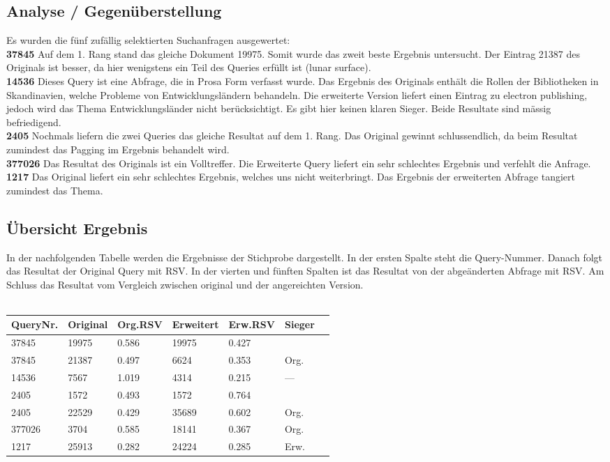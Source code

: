 \documentclass[a4paper, 10pt, ngerman, fleqn]{article}
\begin{document}
\subsection{Analyse / Gegenüberstellung}
Es wurden die fünf zufällig selektierten Suchanfragen ausgewertet:\\
\textbf{37845} Auf dem 1. Rang stand das gleiche Dokument 19975. Somit wurde das zweit beste Ergebnis untersucht. Der Eintrag 21387 des Originals ist besser, da hier wenigstens ein Teil des Queries erfüllt ist (lunar surface).\\
\textbf{14536} Dieses Query ist eine Abfrage, die in Prosa Form verfasst wurde. Das Ergebnis des Originals enthält die Rollen der Bibliotheken in Skandinavien, welche Probleme von Entwicklungsländern behandeln. Die erweiterte Version liefert einen Eintrag zu electron publishing, jedoch wird das Thema Entwicklungsländer nicht berücksichtigt. Es gibt hier keinen klaren Sieger. Beide Resultate sind mässig befriedigend.\\
\textbf{2405} Nochmals liefern die zwei Queries das gleiche Resultat auf dem 1. Rang. Das Original gewinnt schlussendlich, da beim Resultat zumindest das Pagging im Ergebnis behandelt wird.\\
\textbf{377026} Das Resultat des Originals ist ein Volltreffer. Die Erweiterte Query liefert ein sehr schlechtes Ergebnis und verfehlt die Anfrage.\\
\textbf{1217} Das Original liefert ein sehr schlechtes Ergebnis, welches uns nicht weiterbringt. Das Ergebnis der erweiterten Abfrage tangiert zumindest das Thema. 

\subsection{Übersicht Ergebnis}
In der nachfolgenden Tabelle werden die Ergebnisse der Stichprobe dargestellt. In der ersten Spalte steht die Query-Nummer. Danach folgt das Resultat der Original Query mit RSV. In der vierten und fünften Spalten ist das Resultat von der abgeänderten Abfrage mit RSV. Am Schluss das Resultat vom Vergleich zwischen original und der angereichten Version.\\
\\
\begin{tabular}{|l|l|l|l|l|l|l|}\hline\hline
	\textbf{QueryNr.} & \textbf{Original} & \textbf{Org.RSV} & \textbf{Erweitert} & \textbf{Erw.RSV} & \textbf{Sieger} \\ \hline
	37845  & 19975 & 0.586 & 19975 & 0.427 &      \\ \hline
	37845  & 21387 & 0.497 & 6624  & 0.353 & Org. \\ \hline
	14536  & 7567  & 1.019 & 4314  & 0.215 & ---  \\ \hline
	2405   & 1572  & 0.493 & 1572  & 0.764 &      \\ \hline
	2405   & 22529 & 0.429 & 35689 & 0.602 & Org. \\ \hline
	377026 & 3704  & 0.585 & 18141 & 0.367 & Org. \\ \hline
	1217   & 25913 & 0.282 & 24224 & 0.285 & Erw. \\ \hline\hline
\end{tabular}
\end{document}
